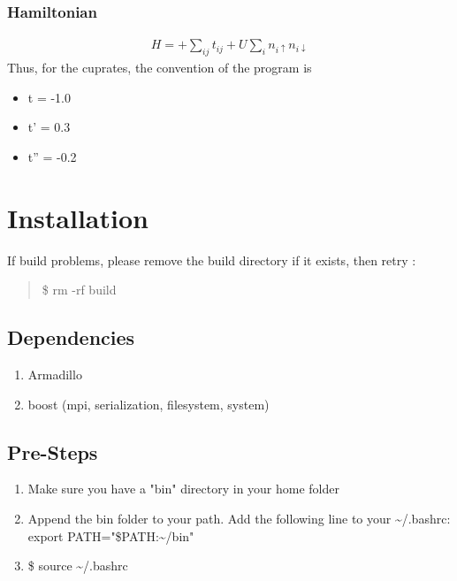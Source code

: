 \documentclass[letterpaper,10pt,english]{sphinxmanual}
\begin{document}
\subsection{Hamiltonian}
\label{\detokenize{intro:hamiltonian}}\begin{equation*}
\begin{split}H = + \sum_{ij} t_{ij} + U \sum_{i} n_{i \uparrow} n_{i \downarrow}\end{split}
\end{equation*}
Thus, for the cuprates, the convention of the program is
\begin{itemize}
\item {} 
t = -1.0

\item {} 
t' = 0.3

\item {} 
t'' = -0.2

\end{itemize}


\chapter{Installation}
\label{\detokenize{installation:installation}}\label{\detokenize{installation::doc}}\label{\detokenize{installation:id1}}
If build problems,
please remove the build directory if it exists, then retry :
\begin{quote}

\$ rm -rf build
\end{quote}


\section{Dependencies}
\label{\detokenize{installation:dependencies}}\begin{enumerate}
\item {} 
Armadillo

\item {} 
boost (mpi, serialization, filesystem, system)

\end{enumerate}


\section{Pre-Steps}
\label{\detokenize{installation:pre-steps}}\begin{enumerate}
\item {} 
Make sure you have a "bin" directory in your home folder

\item {} 
Append the bin folder to your path. Add the following line to your \textasciitilde{}/.bashrc:  export PATH="\$PATH:\textasciitilde{}/bin"

\item {} 
\$ source \textasciitilde{}/.bashrc

\end{enumerate}
\end{document}
